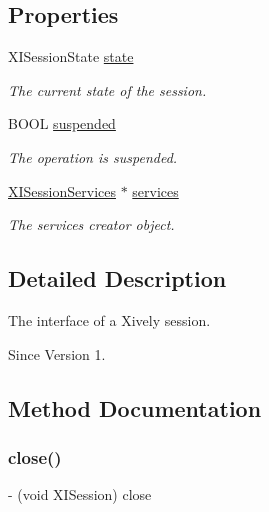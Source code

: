 \subsection*{Properties}
\begin{DoxyCompactItemize}
\item 
X\+I\+Session\+State \hyperlink{protocol_x_i_session_01-p_a2bf3bb210d784bc62f51b321487d237a}{state}
\begin{DoxyCompactList}\small\item\em The current state of the session. \end{DoxyCompactList}\item 
B\+O\+OL \hyperlink{protocol_x_i_session_01-p_ac0fba6335bebf860a1bc5ba90d972944}{suspended}
\begin{DoxyCompactList}\small\item\em The operation is suspended. \end{DoxyCompactList}\item 
\hyperlink{interface_x_i_session_services}{X\+I\+Session\+Services} $\ast$ \hyperlink{protocol_x_i_session_01-p_ab01a51f9111d2b2a172d2993e3cdaf55}{services}
\begin{DoxyCompactList}\small\item\em The services creator object. \end{DoxyCompactList}\end{DoxyCompactItemize}


\subsection{Detailed Description}
The interface of a Xively session. 

\begin{DoxySince}{Since}
Version 1. 
\end{DoxySince}


\subsection{Method Documentation}
\hypertarget{protocol_x_i_session_01-p_a8f423fa580b199179874b97c65486ae8}{}\label{protocol_x_i_session_01-p_a8f423fa580b199179874b97c65486ae8} 
\subsubsection{\texorpdfstring{close()}{close()}}
{\footnotesize\ttfamily -\/ (void X\+I\+Session) close \begin{DoxyParamCaption}{ }\end{DoxyParamCaption}}



